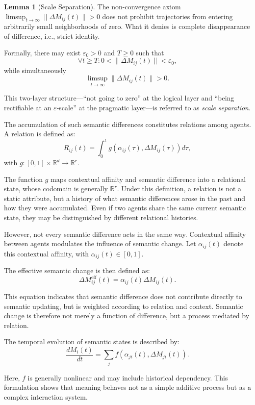 \documentclass[11pt,a4paper]{article}
\theoremstyle{definition}
\newtheorem{lemma}{Lemma}[section]
\begin{document}
\begin{lemma}[Scale Separation]
The non-convergence axiom $\limsup_{t \to \infty} \|\Delta M_{ij}(t)\| > 0$ does not prohibit trajectories from entering arbitrarily small neighborhoods of zero. What it denies is complete disappearance of difference, i.e., strict identity. 

Formally, there may exist $\varepsilon_0 > 0$ and $T \geq 0$ such that
\[
\forall t \geq T: 0 < \|\Delta M_{ij}(t)\| < \varepsilon_0,
\]
while simultaneously
\[
\limsup_{t \to \infty} \|\Delta M_{ij}(t)\| > 0.
\]

This two-layer structure---``not going to zero'' at the logical layer and ``being rectifiable at an $\varepsilon$-scale'' at the pragmatic layer---is referred to as \textit{scale separation}.
\end{lemma}

The accumulation of such semantic differences constitutes relations among agents. A relation is defined as:
\[
R_{ij}(t) = \int_0^t g(\alpha_{ij}(\tau), \Delta M_{ij}(\tau)) d\tau,
\]
with $g : [0, 1] \times \mathbb{R}^d \to \mathbb{R}^r$.

The function $g$ maps contextual affinity and semantic difference into a relational state, whose codomain is generally $\mathbb{R}^r$. Under this definition, a relation is not a static attribute, but a history of what semantic differences arose in the past and how they were accumulated. Even if two agents share the same current semantic state, they may be distinguished by different relational histories.

However, not every semantic difference acts in the same way. Contextual affinity between agents modulates the influence of semantic change. Let $\alpha_{ij}(t)$ denote this contextual affinity, with $\alpha_{ij}(t) \in [0, 1]$.

The effective semantic change is then defined as:
\[
\Delta M^{\text{eff}}_{ij}(t) = \alpha_{ij}(t) \Delta M_{ij}(t).
\]

This equation indicates that semantic difference does not contribute directly to semantic updating, but is weighted according to relation and context. Semantic change is therefore not merely a function of difference, but a process mediated by relation.

The temporal evolution of semantic states is described by:
\[
\frac{dM_i(t)}{dt} = \sum_j f(\alpha_{ji}(t), \Delta M_{ji}(t)).
\]

Here, $f$ is generally nonlinear and may include historical dependency. This formulation shows that meaning behaves not as a simple additive process but as a complex interaction system.
\end{document}
